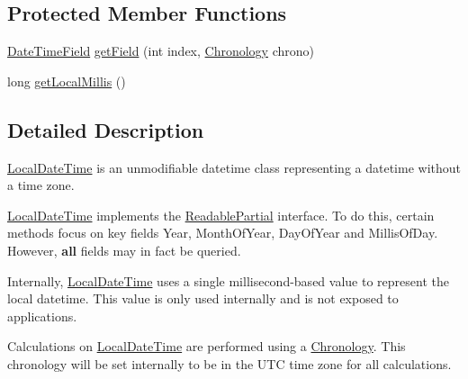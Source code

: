 \subsection*{Protected Member Functions}
\begin{DoxyCompactItemize}
\item 
\hyperlink{classorg_1_1joda_1_1time_1_1_date_time_field}{Date\-Time\-Field} \hyperlink{classorg_1_1joda_1_1time_1_1_local_date_time_a149ce3301a57933e71903c294297780f}{get\-Field} (int index, \hyperlink{classorg_1_1joda_1_1time_1_1_chronology}{Chronology} chrono)
\item 
long \hyperlink{classorg_1_1joda_1_1time_1_1_local_date_time_a1e28e48e8f55c041f1619d8f3d2b8d79}{get\-Local\-Millis} ()
\end{DoxyCompactItemize}


\subsection{Detailed Description}
\hyperlink{classorg_1_1joda_1_1time_1_1_local_date_time}{Local\-Date\-Time} is an unmodifiable datetime class representing a datetime without a time zone. 

\hyperlink{classorg_1_1joda_1_1time_1_1_local_date_time}{Local\-Date\-Time} implements the \hyperlink{interfaceorg_1_1joda_1_1time_1_1_readable_partial}{Readable\-Partial} interface. To do this, certain methods focus on key fields Year, Month\-Of\-Year, Day\-Of\-Year and Millis\-Of\-Day. However, {\bfseries all} fields may in fact be queried. 

Internally, \hyperlink{classorg_1_1joda_1_1time_1_1_local_date_time}{Local\-Date\-Time} uses a single millisecond-\/based value to represent the local datetime. This value is only used internally and is not exposed to applications. 

Calculations on \hyperlink{classorg_1_1joda_1_1time_1_1_local_date_time}{Local\-Date\-Time} are performed using a \hyperlink{classorg_1_1joda_1_1time_1_1_chronology}{Chronology}. This chronology will be set internally to be in the U\-T\-C time zone for all calculations.


